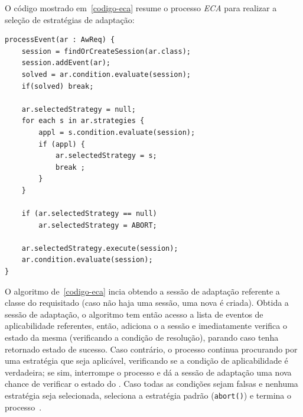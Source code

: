 O código mostrado em~\ref{codigo-eca} resume o processo \textit{ECA} para realizar a seleção de estratégias de adaptação:

\begin{lstlisting}[caption={Código do processo ECA},label={codigo-eca}]
processEvent(ar : AwReq) {
	session = findOrCreateSession(ar.class);
	session.addEvent(ar);
	solved = ar.condition.evaluate(session);
	if(solved) break;

	ar.selectedStrategy = null;
	for each s in ar.strategies {
		appl = s.condition.evaluate(session);
		if (appl) {
			ar.selectedStrategy = s;
			break ;
		}
	}

	if (ar.selectedStrategy == null)
		ar.selectedStrategy = ABORT;

	ar.selectedStrategy.execute(session);
	ar.condition.evaluate(session);
}
\end{lstlisting}

O algoritmo de~\ref{codigo-eca} incia obtendo a sessão de adaptação referente a classe do \awreq requisitado (caso não haja uma sessão, uma nova é criada). Obtida a sessão de adaptação, o algoritmo tem então acesso a lista de eventos de aplicabilidade referentes, então, adiciona o \awreq a sessão e imediatamente verifica o estado da mesma (verificando a condição de resolução), parando caso tenha retornado estado de sucesso. Caso contrário, o processo continua procurando por uma estratégia que seja aplicável, verificando se a condição de aplicabilidade é verdadeira; se sim, interrompe o processo e dá a sessão de adaptação uma nova chance de verificar o estado do \awreq. Caso todas as condições sejam falsas e nenhuma estratégia seja selecionada, seleciona a estratégia padrão (\texttt{abort()}) e termina o processo~\cite{tesevitor}. 

